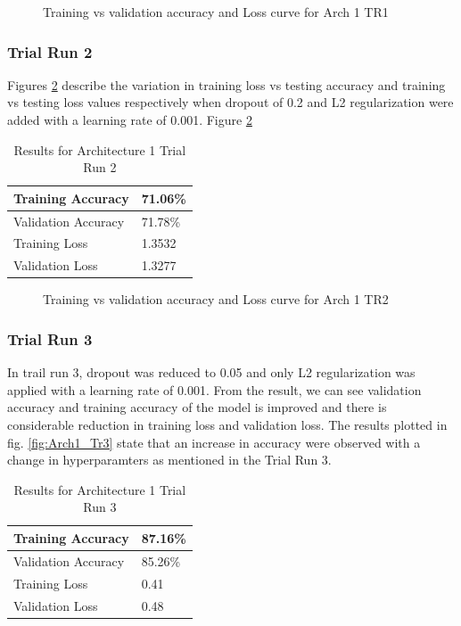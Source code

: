 \documentclass{article}
\begin{document}
\begin{figure}[H]
    \centering
    \qquad
    \caption{Training vs validation accuracy and Loss curve for Arch 1 TR1}%
    \label{fig:Arch1_Tr1}%
\end{figure}

\subsubsection{Trial Run 2}
Figures \ref{fig:Arch1_Tr2} describe the variation in training loss vs testing accuracy and training vs testing loss values respectively when dropout of 0.2 and L2 regularization were added with a learning rate of 0.001. Figure \ref{fig:Arch1_Tr2}
\begin{table}[h]
\centering
\caption{Results for Architecture 1 Trial Run 2}
\begin{tabular}{|l|l|}
\hline
Training Accuracy   & 71.06\% \\ \hline
Validation Accuracy & 71.78\% \\ \hline
Training Loss        & 1.3532    \\ \hline
Validation Loss     & 1.3277    \\ \hline
\end{tabular}
\end{table}

\begin{figure}[H]
    \centering
    \qquad
    \caption{Training vs validation accuracy and Loss curve for Arch 1 TR2}%
    \label{fig:Arch1_Tr2}%
\end{figure}

\subsubsection{Trial Run 3}
In trail run 3, dropout was reduced to 0.05 and only L2 regularization was applied with a learning rate of 0.001. From the result, we can see validation accuracy and training accuracy of the model is improved and there is considerable reduction in training loss and validation loss. The results plotted in fig. \ref{fig:Arch1_Tr3} state that an increase in accuracy were observed with a change in hyperparamters as mentioned in the Trial Run 3.

\begin{table}[h]
\centering
\caption{Results for Architecture 1 Trial Run 3}
\begin{tabular}{|l|l|}
\hline
Training Accuracy   & 87.16\% \\ \hline
Validation Accuracy & 85.26\% \\ \hline
Training Loss        & 0.41    \\ \hline
Validation Loss     & 0.48    \\ \hline
\end{tabular}
\end{table}
\end{document}
